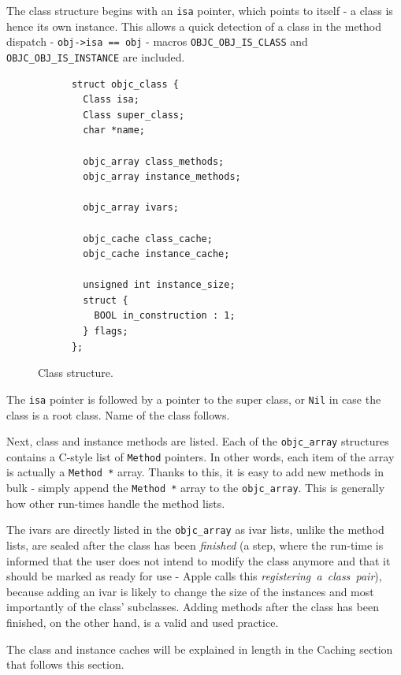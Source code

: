 The class structure begins with an \verb=isa= pointer, which points to itself - a class is hence its own instance. This allows a quick detection of a class in the method dispatch - \verb+obj->isa == obj+ - macros \verb=OBJC_OBJ_IS_CLASS= and \newline{}\verb=OBJC_OBJ_IS_INSTANCE= are included.

\begin{figure}[H] 
  
    \begin{verbatim}
      struct objc_class {
        Class isa;
        Class super_class;
        char *name;
        
        objc_array class_methods;
        objc_array instance_methods;
        
        objc_array ivars;
        
        objc_cache class_cache;
        objc_cache instance_cache;
        
        unsigned int instance_size;
        struct {
          BOOL in_construction : 1;
        } flags;
      };
    \end{verbatim}

  \centering{}
  \caption{Class structure.}
  \label{fig:class_struct}
\end{figure}

The \verb=isa= pointer is followed by a pointer to the super class, or \verb=Nil= in case the class is a root class. Name of the class follows.

Next, class and instance methods are listed. Each of the \verb=objc_array= structures contains a C-style list of \verb=Method= pointers. In other words, each item of the array is actually a \verb=Method *= array. Thanks to this, it is easy to add new methods in bulk - simply append the \verb=Method *= array to the \verb=objc_array=. This is generally how other run-times handle the method lists.

The ivars are directly listed in the \verb=objc_array= as ivar lists, unlike the method lists, are sealed after the class has been \emph{finished} (a step, where the run-time is informed that the user does not intend to modify the class anymore and that it should be marked as ready for use - Apple calls this \emph{registering\ a\ class\ pair}), because adding an ivar is likely to change the size of the instances and most importantly of the class' subclasses. Adding methods after the class has been finished, on the other hand, is a valid and used practice.

The class and instance caches will be explained in length in the Caching section that follows this section.

